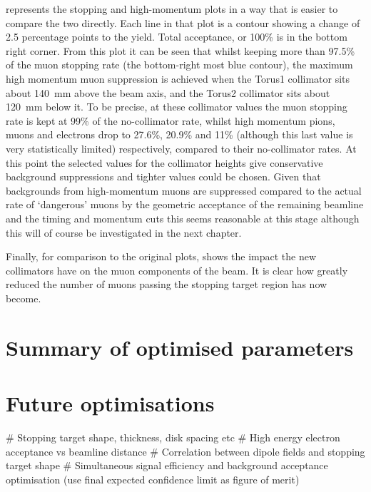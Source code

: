  represents the stopping and high-momentum plots in a way that is easier to compare the two directly.
Each line in that plot is a contour showing a change of 2.5 percentage points to the yield.  Total acceptance, or 100\% is in the bottom right corner.
From this plot it can be seen that whilst keeping more than 97.5\% of the muon stopping rate (the bottom-right most blue contour), the maximum high momentum muon suppression is achieved when the Torus1 collimator sits about 140~mm above the beam axis, and the Torus2 collimator sits about 120~mm below it.
To be precise, at these collimator values  the muon stopping rate is kept at 99\% of the no-collimator rate, whilst high momentum pions, muons and electrons drop to 27.6\%, 20.9\% and 11\% (although this last value is very statistically limited) respectively, compared to their no-collimator rates.
At this point the selected values for the collimator heights give conservative background suppressions and tighter values could be chosen.
Given that backgrounds from high-momentum muons are suppressed compared to the actual rate of `dangerous' muons by the geometric acceptance of the remaining beamline and the timing and momentum cuts this seems reasonable at this stage although this will of course be investigated in the next chapter.

Finally, for comparison to the original plots,  shows the impact the new collimators have on the muon components of the beam.
It is clear how greatly reduced the number of muons passing the stopping target region has now become.


\section{Summary of optimised parameters}
\section{Future optimisations}
\begin{easylist}
# Stopping target shape, thickness, disk spacing etc
# High energy electron acceptance vs beamline distance
# Correlation between dipole fields and stopping target shape
# Simultaneous signal efficiency and background acceptance optimisation (use final expected confidence limit as figure of merit)
\end{easylist}
